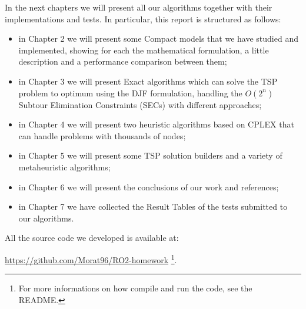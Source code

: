 \noindent 
In the next chapters we will present all our algorithms together with their implementations and tests. In particular, this report is structured as follows:

\begin{itemize}
  \item in Chapter 2 we will present some Compact models that we have studied and implemented, showing for each the mathematical formulation, a little description and a performance comparison between them;
  \item in Chapter 3 we will present Exact algorithms which can solve the TSP problem to optimum using the DJF formulation, handling the $O(2^n)$ Subtour Elimination Constraints (SECs) with different approaches;
    \item in Chapter 4 we will present two heuristic algorithms based on CPLEX that can handle problems with thousands of nodes;
    \item in Chapter 5 we will present some TSP solution builders and a variety of metaheuristic algorithms;
     \item in Chapter 6 we will present the conclusions of our work and references;
     \item in Chapter 7 we have collected the Result Tables of the tests submitted to our algorithms.
\end{itemize}

All the source code we developed is available at:
\begin{center}
\url{https://github.com/Morat96/RO2-homework} \footnote{For more informations on how compile and run the code, see the README.}. 

\end{center}

